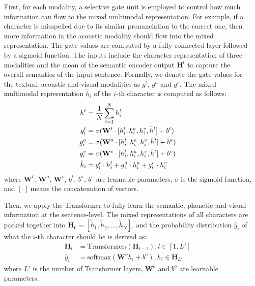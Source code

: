 \documentclass[11pt,a4paper]{article}
\begin{document}
First, for each modality, a selective gate unit is employed to control how much information can flow to the mixed multimodal representation.
For example, if a character is misspelled due to its similar pronunciation to the correct one, then more information in the acoustic modality should flow into the mixed representation. 
The gate values are computed by a fully-connected layer followed by a sigmoid function.
The inputs include the character representation of three modalities and the mean of the semantic encoder output $\mathbf{H}^t$ to capture the overall semantics of the input sentence. 
Formally, we denote the gate values for the textual, acoustic and visual modalities as $g^t$, $g^a$ and $g^v$. The mixed multimodal representation $\tilde{h}_i$ of the $i$-th character is computed as follows: 
\begin{equation}
\begin{split}
    \Bar{h}^t &= \frac{1}{N} \sum_{i=1}^{N}{h^t_i} \\
    g^t_i &= \sigma(\mathbf{W}^t \cdot [h^t_i, h^a_i, h^v_i, \Bar{h}^t] + b^t) \\
    g^a_i &= \sigma(\mathbf{W}^a \cdot [h^t_i, h^a_i, h^v_i, \Bar{h}^t] + b^a) \\
    g^v_i &= \sigma(\mathbf{W}^v \cdot [h^t_i, h^a_i, h^v_i, \Bar{h}^t] + b^v) \\
    \tilde{h}_i &= g^t_i \cdot h^t_i + g^a_i \cdot h^a_i + g^v_i \cdot h^v_i
\end{split}
\end{equation}
where $\mathbf{W}^t$, $\mathbf{W}^a$, $\mathbf{W}^v$, $b^t$, $b^a$, $b^v$ are learnable parameters, $\sigma$ is the sigmoid function, and $[\cdot]$ means the concatenation of vectors. 


Then, we apply the Transformer to fully learn the semantic, phonetic and visual information at the sentence-level.
The mixed representations of all characters are packed together into $\mathbf{H}_0=[\tilde{h}_1, \tilde{h}_2, ..., \tilde{h}_N]$, and the probability distribution $\hat{y}_i$ of what the $i$-th character should be is derived as:
\begin{equation}
\begin{split}
    \mathbf{H}_l &= \text{Transformer}_l (\mathbf{H}_{l-1}), l \in [1, L'] \\
    \hat{y}_i &= \textrm{softmax}(\mathbf{W}^o h_i + b^o), h_i \in \mathbf{H}_{L'}
\end{split}
\end{equation}
where $L'$ is the number of Transformer layers, $\mathbf{W}^o$ and $b^o$ are learnable parameters. 
\end{document}
